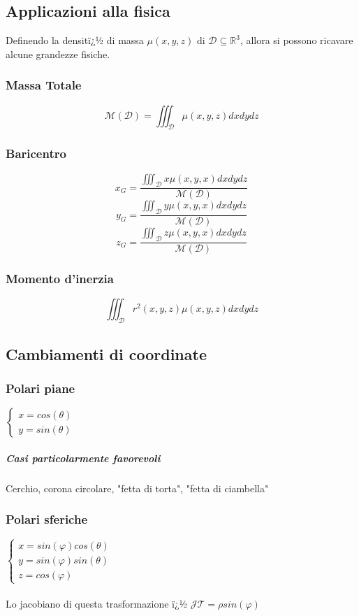 \documentclass[10pt,a4paper]{report}
\begin{document}
		\subsection*{Applicazioni alla fisica}
		Definendo la densitï¿½ di massa $ \mu (x,y,z) $ di $\mathcal{D}\subseteq \mathbb{R}^{3}$, allora si possono ricavare alcune grandezze fisiche.
			\subsubsection{Massa Totale}
			\[ \mathcal{M}(\mathcal{D})= \iiint_{\mathcal{D}} \mu(x,y,z) dx dy dz \]
			
			\subsubsection{Baricentro}
			\[ x_{G}=\frac{\iiint_{\mathcal{D}} x \mu (x,y,x) dx dy dz}{ \mathcal{M}(\mathcal{D})} \]
			\[ y_{G}=\frac{\iiint_{\mathcal{D}} y \mu (x,y,x) dx dy dz}{ \mathcal{M}(\mathcal{D})} \]
			\[ z_{G}=\frac{\iiint_{\mathcal{D}} z \mu (x,y,x) dx dy dz}{ \mathcal{M}(\mathcal{D})} \]
			
			\subsubsection{Momento d'inerzia}
			\[ \iiint_{\mathcal{D}} r^{2}(x,y,z) \mu(x,y,z) dx dy dz \]

		\subsection*{Cambiamenti di coordinate}
			\subsubsection{Polari piane}
			$ \begin{cases} 
				x=cos(\theta) \\ 
				y=sin(\theta)
			\end{cases} $
				\subparagraph{Casi particolarmente favorevoli}
				Cerchio, corona circolare, "fetta di torta", "fetta di ciambella"
			\subsubsection{Polari sferiche}
			$ \begin{cases} 
				x=sin(\varphi)cos(\theta) \\ 
				y=sin(\varphi)sin(\theta) \\
				z=cos(\varphi)
			\end{cases} $
			\\ \\
			Lo jacobiano di questa trasformazione ï¿½ $ \mathcal{J} \mathcal{T} = \rho sin(\varphi) $
			
\end{document}
